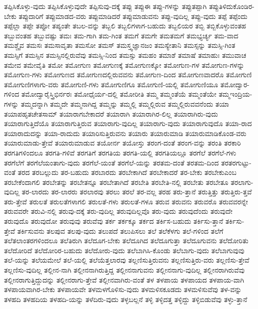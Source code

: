 {ತಪ್ಪಿಸಿಕೊಳ್ಳು-ವುದು
ತಪ್ಪಿಸಿಕೊಳ್ಳುವುದೇ
ತಪ್ಪಿಸುವು-ದಕ್ಕೆ
ತಪ್ಪು
ತಪ್ಪುಈ
ತಪ್ಪು-ಗಳನ್ನು
ತಪ್ಪುತಪ್ಪಾಗಿ
ತಪ್ಪುತಿಳಿದುಕೊಂಡಿರ-ಬೇಕು
ತಪ್ಪುದಾರಿಗೆ
ತಪ್ಪುಮಾಡದ-ವರು
ತಪ್ಪುಮಾಡಿದರೆ
ತಪ್ಪುಮಾಡುವನು
ತಪ್ಪು-ವುದಿಲ್ಲ
ತಪ್ಪು-ವುದು
ತಪ್ಪೆ
ತಪ್ಪೆಂದು
ತಪ್ಪೆಲ್ಲಾ
ತಪ್ಪೇ
ತಪ್ಪೋ
ತಪ್ಯಂತೇ
ತಬಲ-ವನ್ನು
ತಬ್ಬಲಿ
ತಬ್ಬಲಿಗಳಾಗ-ಬಹುದು
ತಬ್ಬಲಿಯರ
ತಬ್ಬಿ
ತಬ್ಬಿಕೊಳ್ಳುವಂತಹ
ತಬ್ಬುವಂತಹ
ತಬ್ಬುವಷ್ಟು
ತಮಃ
ತಮ-ಗಾಗಿ
ತಮ-ಗಿಂತ
ತಮಗೆ
ತಮಗೇ
ತಮತಮಗೆ
ತಮಭ್ಯರ್ಚ್ಯ
ತಮ-ವಾದ
ತಮಶ್ಚೈವ
ತಮಸಃ
ತಮಸಾವೃತಾ
ತಮಸೋ
ತಮಸ್
ತಮಸ್ತ್ವಜ್ಞಾನಜಂ
ತಮಸ್ಯೇತಾನಿ
ತಮಸ್ಸನ್ನು
ತಮಸ್ಸಿ-ಗಿಂತ
ತಮಸ್ಸಿಗೆ
ತಮಸ್ಸಿನ
ತಮಸ್ಸಿನಲ್ಲಿರುವೆವು
ತಮಸ್ಸಿ-ನಿಂದ
ತಮಸ್ಸು
ತಮಹಂ
ತಮಾಶೆ
ತಮಾಷೆ
ತಮಾಹುಃ
ತಮುವಾಚ
ತಮೇವ
ತಮೇವೈತಿ
ತಮೋ
ತಮೋಗುಣ
ತಮೋಗುಣಕ್ಕೆ
ತಮೋಗುಣಕ್ಕೋ
ತಮೋಗುಣ-ಗಳ
ತಮೋಗುಣ-ಗಳನ್ನು
ತಮೋಗುಣ-ಗಳು
ತಮೋಗುಣದ
ತಮೋಗುಣದಲ್ಲಿರುವವನು
ತಮೋಗುಣ-ದಿಂದ
ತಮೋಗುಣವಾದರೊ
ತಮೋಗುಣಿ
ತಮೋಗುಣಿಗಳಾಗು-ವರು
ತಮೋಗುಣಿ-ಗಳು
ತಮೋಗುಣಿಗೂ
ತಮೋಗುಣಿ-ಯಲ್ಲಿ
ತಮೋಗುಣಿಯೂ
ತಮೋದ್ವಾರ-ಗಳಿಂದ
ತಮೋದ್ವಾರೈಸ್ತ್ರಿಭಿರ್ನರಃ
ತಮೋಧೈರ್ಯ-ದಲ್ಲಿ
ತಮೋರೀತಿ
ತಮ್ಮ
ತಮ್ಮಂತೆಯೆ
ತಮ್ಮಂತೆಯೇ
ತಮ್ಮಇಂದ್ರಿಯ-ಗಳನ್ನು
ತಮ್ಮದನ್ನಾಗಿ
ತಮ್ಮದೇ
ತಮ್ಮನಾಗಿದ್ದ
ತಮ್ಮನ್ನು
ತಮ್ಮಲ್ಲಿ
ತಮ್ಮಲ್ಲಿರುವ
ತಮ್ಮಲ್ಲಿರುವವನೆಂದು
ತಯಾ
ತಯಾಪಹೃತಚೇತಸಾಮ್
ತಯಾರಾಗಬೇಕಾದರೆ
ತಯಾರಾಗಿ
ತಯಾರಾಗಿರ-ಲಿಲ್ಲ
ತಯಾರಾಗಿರು-ವುದು
ತಯಾರಾಗುತ್ತಿದೆಯೊ
ತಯಾರಾಗುತ್ತಿರುವ
ತಯಾರಾಗು-ವುದಿಲ್ಲ
ತಯಾರಾಗು-ವುದು
ತಯಾರಾಗುವುದೊ
ತಯಾ-ರಾದ
ತಯಾರಾದುದನ್ನು
ತಯಾ-ರಾದುದು
ತಯಾರಿಸುತ್ತಿರುವನು
ತಯಾರು
ತಯಾರುಮಾಡಿ
ತಯಾರುಮಾಡಿಕೊಂಡ-ವರು
ತಯಾರುಮಾಡು-ತ್ತೇವೆ
ತಯಾರುಮಾಡುವ
ತಯೋರ್ನ
ತಯೋಸ್ತು
ತರಂಗ-ದಂತೆ
ತರಂಗ-ವನ್ನು
ತರಂತಿ
ತರಕಾರಿ
ತರಗತಿಗಳಿಂದಲೂ
ತರಗತಿ-ಗಳಿವೆ
ತರಗತಿಗೆ
ತರಗತಿಯ
ತರಗತಿ-ಯಲ್ಲಿ
ತರಗತಿಯಲ್ಲೂ
ತರಗೆಲೆ
ತರಗೆಲೆ-ಗಳು
ತರಗೆಲೆಗೆ
ತರಗೆಲೆಯಂತಾಗು-ವುದು
ತರಗೆಲೆ-ಯಂತೆ
ತರಗೆಲೆ-ಯನ್ನು
ತರತಮ-ದಂತೆ
ತರತಮ-ದಿಂದ
ತರತರಗುಟ್ಟು-ವಂತೆ
ತರದ
ತರಬಲ್ಲುದು
ತರ-ಬಹುದು
ತರಬಾರದು
ತರಬೇಕಾಗಿದೆ
ತರಬೇಕಾದರೆ
ತರ-ಬೇಕು
ತರಬೇಕುಎಂಬ
ತರಬೇಕೆಂದಾಗಲಿ
ತರಬೇತನ್ನು
ತರಬೇತನ್ನೂ
ತರಬೇತಾಗಿದೆ
ತರಬೇತಿ
ತರಬೇತಿ-ನಲ್ಲಿ
ತರಬೇತು
ತರಬೇತೂ
ತರಲಾಗು-ವುದಿಲ್ಲ
ತರ-ಲಾರದು
ತರ-ಲಾರರು
ತರಲಾರವು
ತರಲು
ತರಲೆ
ತರ-ವಲ್ಲ
ತರಹ
ತರು-ತ್ತಾನೆ
ತರುತ್ತಿತ್ತು
ತರುತ್ತಿರು-ತ್ತವೆ
ತರು-ತ್ತೇವೆ
ತರುಲತೆ
ತರುಲತೆಗಳಾಗಲಿ
ತರುಲತೆ-ಗಳು
ತರುಲತೆ-ಗಳೂ
ತರುವ
ತರುವನು
ತರುವರೊ
ತರುವವರನ್ನೇ
ತರುವವರೇ
ತರುವಿ-ನಲ್ಲಿ
ತರುವು-ದಕ್ಕೆ
ತರು-ವುದಿಲ್ಲ
ತರುವುದಿಲ್ಲವೊ
ತರು-ವುದು
ತರುವುದೆಂದು
ತರುವುದೇ
ತರುವುದೊ
ತರುವುದೋ
ತರುವುವು
ತರುವೆವು
ತರ್ಕ
ತರ್ಕಕ್ಕೂ
ತರ್ಕದ
ತರ್ಕಿಸ-ಬಹುದು
ತರ್ಕಿಸು-ತ್ತಾನೆ
ತರ್ಕಿಸು-ತ್ತೇವೆ
ತರ್ಕಿಸುವನು
ತಲಪುವ
ತಲಪು-ವುದು
ತಲುಪದೆ
ತಲುಪಿಸಲು
ತಲೆ
ತಲೆಕೆಳಗು
ತಲೆ-ಗಳಿಂದ
ತಲೆಗೆ
ತಲೆತಲಾಂತರಗಳಿಂದಲೂ
ತಲೆತಿರುಗಿ
ತಲೆದೂಗ-ಬೇಕು
ತಲೆದೂಗಿದ
ತಲೆದೂಗುತ್ತಾ
ತಲೆದೂಗುವನು
ತಲೆದೋರಿತು
ತಲೆದೋರಿದೆ
ತಲೆದೋರಿರ-ಬಹುದು
ತಲೆದೋರು-ವುದು
ತಲೆಬಾಗಿಸಿ-ಕೊಂಡು
ತಲೆಬಾಗು-ವುದು
ತಲೆಬಾಗುವುವು
ತಲೆ-ಯನ್ನು
ತಲೆಯಮೇಲೆ
ತಲೆ-ಯಲ್ಲಿ
ತಲೆಯೆತ್ತಲಾರವು
ತಲ್ಲಣಿಸುತ್ತಿರುವನು
ತಲ್ಲಣಿಸುತ್ತಿರು-ವರು
ತಲ್ಲಣಿಸು-ತ್ತೇವೆ
ತಲ್ಲಣಿಸು-ವುದಿಲ್ಲ
ತಲ್ಲೀನ-ನಾಗಿ
ತಲ್ಲೀನನಾಗಿರುತ್ತಿದ್ದ
ತಲ್ಲೀನನಾಗುವನು
ತಲ್ಲೀನನಾಗು-ವುದಿಲ್ಲ
ತಲ್ಲೀನರಾಗಿರುವೆವು
ತಲ್ಲೀನರಾಗುತ್ತಿದ್ದುದನ್ನು
ತಲ್ಲೀನರಾಗು-ತ್ತೇವೆ
ತಲ್ಲೀನವಾಗಿರು-ವಂತೆ
ತಳ
ತಳಪಾಯ
ತಳಪಾಯದ
ತಳಪಾಯ-ವಾಗಿ
ತಳಪಾಯವಾಗಿರ-ಬೇಕು
ತಳಪಾಯವೇ
ತಳಮಳಗೊಳಿಸು-ವುದು
ತಳಮಳಿಸಕೂಡದು
ತಳಮಳಿಸುವೆವು
ತಳ-ವನ್ನು
ತಳಹದಿ
ತಳಹದಿಯ
ತಳಹದಿ-ಯನ್ನು
ತಳೆದಿರು-ವುದು
ತಳ್ಳಬಲ್ಲನೆ
ತಳ್ಳಿ
ತಳ್ಳಿದತ್ತ
ತಳ್ಳಿದ್ದು
ತಳ್ಳಿಬಿಡುವೆವು
ತಳ್ಳು-ತ್ತಾನೆ
}
